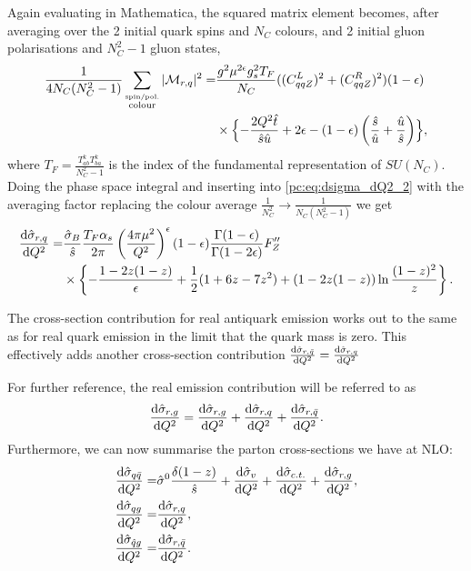 \documentclass[../main.tex]{subfiles}
\begin{document}
Again evaluating in Mathematica, the squared matrix element becomes, after averaging over the 2 initial quark spins and \(N_C\) colours, and 2 initial gluon polarisations and \(N_C^2-1\) gluon states,
\begin{align}
  \nonumber
  \frac{1}{4N_C(N_C^2-1)} \sum_{\stackrel{\text{spin/pol.}}{\text{colour}}}|\M_{r,q}|^2 = & \frac{g^2 \mu^{2\epsilon} g_s^2 T_F}{N_C} ((C_{qqZ}^L)^2 + (C_{qqZ}^R)^2) (1-\epsilon) \\
                                                                                          & \times\Bigl\{
  -\frac{2Q^2 \hat{t}}{\hat{s} \hat{u}} + 2\epsilon - (1-\epsilon)\pclosed{\frac{\hat{s}}{\hat{u}} + \frac{\hat{u}}{\hat{s}}}
  \Bigr\},
\end{align}
where \(T_F = \frac{T^k_{ab} T^{k}_{ba}}{N_C^2-1}\) is the index of the fundamental representation of \(SU(N_C)\).
Doing the phase space integral and inserting into \cref{pc:eq:dsigma_dQ2_2} with the averaging factor replacing the colour average \(\frac{1}{N_C^2} \to \frac{1}{N_C(N_C^2-1)}\) we get
\begin{align}
  \label{pc:eq:sigma_qg}
  \nonumber
  \d[Q^2]{\hat\sigma_{r,q}} = & \frac{\hat\sigma_B}{\hat{s}} \frac{T_F \alpha_s}{2\pi} \pclosed{\frac{4\pi \mu^2}{Q^2}}^\epsilon (1-\epsilon) \frac{\Gamma(1-\epsilon)}{\Gamma(1-2\epsilon)} F^{\prime\prime}_Z \\
                              & \times \cclosed{-\frac{1-2z(1-z)}{\epsilon} + \frac{1}{2}(1+6z-7z^2) + (1-2z(1-z))\ln\frac{(1-z)^2}{z}}.
\end{align}

The cross-section contribution for real antiquark emission works out to the same as for real quark emission in the limit that the quark mass is zero.
This effectively adds another cross-section contribution \(\d[Q^2]{\hat\sigma_{r,\bar{q}}} = \d[Q^2]{\hat\sigma_{r,q}}\)

For further reference, the real emission contribution will be referred to as
\begin{equation}
  \d[Q^2]{\hat\sigma_{r,g}} = \d[Q^2]{\hat\sigma_{r,g}} + \d[Q^2]{\hat\sigma_{r,q}} + \d[Q^2]{\hat\sigma_{r,\bar{q}}}.
\end{equation}
Furthermore, we can now summarise the parton cross-sections we have at NLO:
\begin{subequations}
  \begin{align}
    \d[Q^2]{\hat\sigma_{q\bar{q}}} = & \hat\sigma^0 \frac{\delta(1-z)}{\hat{s}} + \d[Q^2]{\hat\sigma_v} + \d[Q^2]{\hat\sigma_{c.t.}} + \d[Q^2]{\hat\sigma_{r,g}}, \\
    \d[Q^2]{\hat\sigma_{qg}} =       & \d[Q^2]{\hat\sigma_{r,q}},                                                                                                 \\
    \d[Q^2]{\hat\sigma_{\hat{q}g}} = & \d[Q^2]{\hat\sigma_{r,\bar{q}}}.
  \end{align}
\end{subequations}
\end{document}
